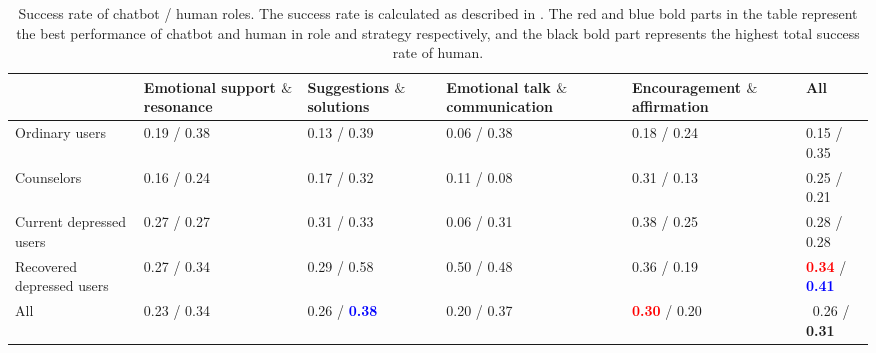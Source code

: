\begin{table}[th]
	\small
    \centering
	\begin{tabular}{p{}|p{}|p{}|p{}|p{}|p{}}
		\toprule
		\diagbox{Role}{strategy} & {Emotional support \( \mbox{\&} \) resonance} & {Suggestions  \( \mbox{\&} \) solutions} & {Emotional talk \( \mbox{\&} \)
 communication} & {Encouragement  \( \mbox{\&} \) affirmation} & {All}\\ \midrule
		Ordinary users & 0.19 / 0.38 & 0.13 / 0.39 & 0.06 / 0.38 & 0.18 / 0.24 & 0.15 / 0.35 \\ \midrule
		Counselors & 0.16 / 0.24 & 0.17 / 0.32 & 0.11 / 0.08 & 0.31 / 0.13 & 0.25 / 0.21   \\ \midrule
        Current depressed users & 0.27 / 0.27  & 0.31 / 0.33 & 0.06 / 0.31 & 0.38 / 0.25 & 0.28  / 0.28  \\ \midrule
        Recovered depressed users & 0.27 / 0.34 & 0.29 / 0.58 & 0.50 / 0.48 & 0.36 / 0.19 & \textcolor{red}{\textbf{0.34}} / \textcolor{blue}{\textbf{0.41}}  \\ \midrule
        All & 0.23 / 0.34 & 0.26 / \textcolor{blue}{\textbf{0.38}} & 0.20 / 0.37 & \textcolor{red}{\textbf{0.30}} / 0.20 &  \ 0.26 / \textbf{0.31}  \\ \midrule
	\end{tabular}
	\caption{Success rate of chatbot / human roles. The success rate is calculated as described in . The red and blue bold parts in the table represent the best performance of chatbot and human in role and strategy respectively, and the black bold part represents the highest total success rate of human.}%
	\label{tab:response_result}
\end{table}

